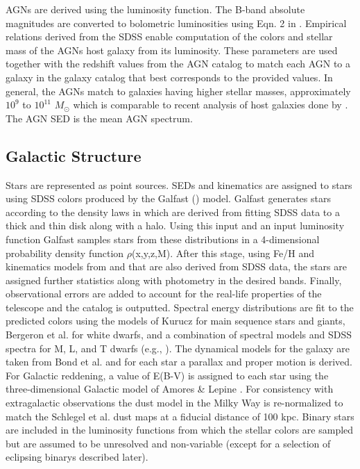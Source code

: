 \documentclass[]{article}
\begin{document}
AGNs are derived using the \cite{bongiorno} luminosity function. The
B-band absolute magnitudes are converted to bolometric luminosities
using Eqn. 2 in \cite{hopkins}. Empirical relations derived from the
SDSS enable computation of the colors and stellar mass of the AGNs
host galaxy from its luminosity. These parameters are used together
with the redshift values from the AGN catalog to match each AGN to a
galaxy in the galaxy catalog that best corresponds to the provided
values. In general, the AGNs match to galaxies having higher stellar
masses, approximately $10^{9}$ to $10^{11}$ $M_{\odot}$ which is
comparable to recent analysis of host galaxies done by \cite{xue}. The
AGN SED is the \cite{vandenberk} mean AGN spectrum. 

\subsection{Galactic Structure \label{sec:star}}

Stars are represented as point sources.  SEDs and kinematics are
assigned to stars using SDSS colors produced by the Galfast
(\cite{galfast}) model.  Galfast generates stars according to the
density laws in \cite{juric} which are derived from fitting SDSS data
to a thick and thin disk along with a halo. Using this input and an
input luminosity function Galfast samples stars from these
distributions in a 4-dimensional probability density function
$\rho$(x,y,z,M). After this stage, using Fe/H and kinematics models
from \cite{ivezic} and \cite{bond} that are also derived from SDSS
data, the stars are assigned further statistics along with photometry
in the desired bands. Finally, observational errors are added to
account for the real-life properties of the telescope and the catalog
is outputted. Spectral energy distributions are fit to the predicted
colors using the models of Kurucz \cite{kurucz93} for main sequence
stars and giants, Bergeron et al. \cite{bergeron95} for white dwarfs,
and a combination of spectral models and SDSS spectra for M, L, and T
dwarfs (e.g.,
\cite{cushing05,bochanski07,burrows06,pettersen89,kowalski10}). The
dynamical models for the galaxy are taken from Bond et
al. \cite{bond09} and for each star a parallax and proper motion is
derived. For Galactic reddening, a value of E(B-V) is assigned to each
star using the three-dimensional Galactic model of Amores \& Lepine
\cite{amores05}. For consistency with extragalactic observations the
dust model in the Milky Way is re-normalized to match the Schlegel et
al. \cite{schlegel98} dust maps at a fiducial distance of 100 kpc.
Binary stars are included in the luminosity functions from which the
stellar colors are sampled but are assumed to be unresolved and
non-variable (except for a selection of eclipsing binarys described
later).
\end{document}
